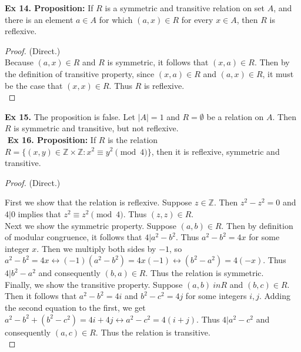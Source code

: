 \documentclass{article}
\begin{document}
\newpage
\noindent \textbf{Ex 14. Proposition:} If $R$ is a symmetric and transitive relation on set $A$, and there is an element $a \in A$ for which $(a,x) \in R$ for every $x \in A$, then $R$ is reflexive.
\begin{proof}
(Direct.)\\
Because $(a,x) \in R$ and $R$ is symmetric, it follows that $(x,a) \in R$. Then by the definition of transitive property, since $(x,a) \in R$ and $(a,x) \in R$, it must be the case that $(x,x) \in R$. Thus $R$ is reflexive.\\
\end{proof}
\noindent \textbf{Ex 15.} The proposition is false. Let $|A|=1$ and $R=\emptyset$ be a relation on $A$. Then $R$ is symmetric and transitive, but not reflexive.\\
$ $\newline
\noindent \textbf{Ex 16. Proposition:}	If $R$ is the relation $R=\{ (x, y) \in \mathbb{Z}\times\mathbb{Z} : x^2 \equiv y^2 \pmod{4} \}$, then it is reflexive, symmetric and transitive.\\
\begin{proof}
(Direct.)

\noindent First we show that the relation is reflexive. Suppose $z \in \mathbb{Z}$. Then $z^2-z^2=0$ and $4|0$ implies that $z^2 \equiv z^2 \pmod{4}$. Thus $(z,z) \in R$.\\

\noindent Next we show the symmetric property. Suppose $(a,b) \in R$. Then by definition of modular congruence, it follows that $4|a^2-b^2$. Thus $a^2-b^2=4x$ for some integer $x$. Then we multiply both sides by $-1$, so $a^2-b^2=4x \leftrightarrow (-1)(a^2-b^2)=4x(-1) \leftrightarrow (b^2-a^2)=4(-x)$. Thus $4|b^2-a^2$ and consequently $(b,a) \in R$. Thus the relation is symmetric.\\

\noindent Finally, we show the transitive property. Suppose $(a,b) \ in R$ and $(b,c) \in R$. Then it follows that $a^2-b^2=4i$ and $b^2-c^2=4j$ for some integers $i, j$. Adding the second equation to the first, we get $a^2-b^2+(b^2-c^2)=4i+4j \leftrightarrow a^2-c^2=4(i+j)$. Thus $4|a^2-c^2$ and consequently $(a,c) \in R$. Thus the relation is transitive.\\
\end{proof}
\end{document}
